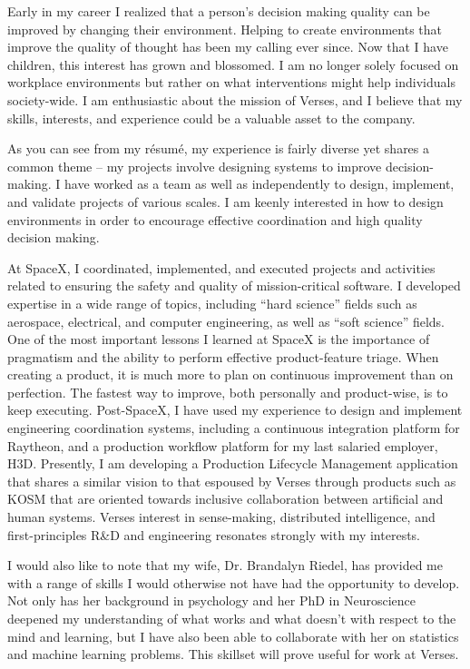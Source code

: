 \begin{cvletter}


Early in my career I realized that a person's decision making quality can be improved by changing
their environment. Helping to create environments that improve the quality of thought has been my
calling ever since. Now that I have children, this interest has grown and blossomed. I am no longer solely
focused on workplace environments but rather on what interventions might help individuals
society-wide. I am enthusiastic about the mission of Verses, and I believe that my skills,
interests, and experience could be a valuable asset to the company.

As you can see from my résumé, my experience is fairly diverse yet shares a common theme -- my
projects involve designing systems to improve decision-making. I have worked as a team as well as
independently to design, implement, and validate projects of various scales. I am keenly interested
in how to design environments in order to encourage effective coordination and high quality decision
making.

At SpaceX, I coordinated, implemented, and executed projects and activities related to ensuring the
safety and quality of mission-critical software. I developed expertise in a wide range of topics,
including ``hard science'' fields such as aerospace, electrical, and computer engineering, as well
as ``soft science'' fields. One of the most important lessons I learned at SpaceX is the importance
of pragmatism and the ability to perform effective product-feature triage. When creating a product,
it is much more to plan on continuous improvement than on perfection. The fastest way to improve,
both personally and product-wise, is to keep executing. Post-SpaceX, I have used my experience to
design and implement engineering coordination systems, including a continuous integration platform
for Raytheon, and a production workflow platform for my last salaried employer, H3D. Presently, I am
developing a Production Lifecycle Management application that shares a similar vision to that
espoused by Verses through products such as KOSM that are oriented towards inclusive collaboration
between artificial and human systems. Verses interest in sense-making, distributed intelligence, and
first-principles R\&D and engineering resonates strongly with my interests.

I would also like to note that my wife, Dr. Brandalyn Riedel, has provided me with a range of skills
I would otherwise not have had the opportunity to develop. Not only has her background in psychology
and her PhD in Neuroscience deepened my understanding of what works and what doesn't with respect to
the mind and learning, but I have also been able to collaborate with her on statistics and machine
learning problems. This skillset will prove useful for work at Verses.


\end{cvletter}
